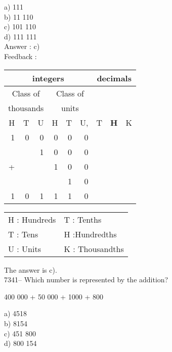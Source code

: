 \documentclass[letterpaper, 12pt]{article}
\begin{document}
a) 111\\
b) 11 110\\
c) 101 110\\
d) 111 111\\

Answer : c)\\

Feedback :\\
\begin{center}
\begin{tabular}{|rrr|rrr|rrr|}
\hline
\multicolumn{6}{|c|}{integers} &\multicolumn{3}{|c|}{decimals} \\
\hline
\multicolumn{3}{|c|}{Class of} &\multicolumn{3}{|c|}{Class of} &  \multicolumn{3}{c|}{} \\
\multicolumn{3}{|c|}{thousands} &\multicolumn{3}{|c|}{units} &  \multicolumn{3}{c|}{} \\
\hline
H & T & U &H & T & U, & T\up{th} & \textbf{H\up{th}} & K\up{th} \\
\hline
\hline
1 & 0 & 0 & 0 & 0 & 0 & & & \\
  &   & 1 & 0 & 0 & 0 & & & \\
+ &   &   & 1 & 0 & 0 & & & \\
  &   &   &   & 1 & 0 & & & \\
\hline
\hline
1 & 0 & 1 & 1 & 1 & 0 & & & \\
\hline
\end{tabular}
\end{center}

\scriptsize
\begin{center}
\begin{tabular}{ll}
H : Hundreds & T\up{th} : Tenths\\
T : Tens & H\up{th} :Hundredths\\
U : Units & K\up{e} : Thousandths\\
\end{tabular}
\end{center}

\normalsize
The answer is c).\\

7341-- Which number is represented by the addition?\\
\begin{center}
400 000 + 50 000 + 1000 + 800
\end{center}

a) 4518\\
b) 8154\\
c) 451 800\\
d) 800 154\\
\end{document}
